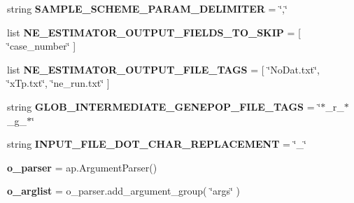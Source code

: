 \begin{DoxyCompactItemize}
\item 
string {\bfseries S\+A\+M\+P\+L\+E\+\_\+\+S\+C\+H\+E\+M\+E\+\_\+\+P\+A\+R\+A\+M\+\_\+\+D\+E\+L\+I\+M\+I\+T\+ER} = \char`\"{},\char`\"{}\hypertarget{namespacenegui_1_1pgdriveneestimator_a968165e72c6ac1b942ae21dc2ec18af2}{}\label{namespacenegui_1_1pgdriveneestimator_a968165e72c6ac1b942ae21dc2ec18af2}

\item 
list {\bfseries N\+E\+\_\+\+E\+S\+T\+I\+M\+A\+T\+O\+R\+\_\+\+O\+U\+T\+P\+U\+T\+\_\+\+F\+I\+E\+L\+D\+S\+\_\+\+T\+O\+\_\+\+S\+K\+IP} = \mbox{[} \char`\"{}case\+\_\+number\char`\"{} \mbox{]}\hypertarget{namespacenegui_1_1pgdriveneestimator_a77c91566694093f57286607ae144d35a}{}\label{namespacenegui_1_1pgdriveneestimator_a77c91566694093f57286607ae144d35a}

\item 
list {\bfseries N\+E\+\_\+\+E\+S\+T\+I\+M\+A\+T\+O\+R\+\_\+\+O\+U\+T\+P\+U\+T\+\_\+\+F\+I\+L\+E\+\_\+\+T\+A\+GS} = \mbox{[} \char`\"{}No\+Dat.\+txt\char`\"{}, \char`\"{}x\+Tp.\+txt\char`\"{}, \char`\"{}ne\+\_\+run.\+txt\char`\"{} \mbox{]}\hypertarget{namespacenegui_1_1pgdriveneestimator_a167fb016fbc3709c4c778c4a5157cd06}{}\label{namespacenegui_1_1pgdriveneestimator_a167fb016fbc3709c4c778c4a5157cd06}

\item 
string {\bfseries G\+L\+O\+B\+\_\+\+I\+N\+T\+E\+R\+M\+E\+D\+I\+A\+T\+E\+\_\+\+G\+E\+N\+E\+P\+O\+P\+\_\+\+F\+I\+L\+E\+\_\+\+T\+A\+GS} = \char`\"{}$\ast$\+\_\+r\+\_\+$\ast$\+\_\+g\+\_\+$\ast$\char`\"{}\hypertarget{namespacenegui_1_1pgdriveneestimator_a1bb977fffd730588ade2008f702d6110}{}\label{namespacenegui_1_1pgdriveneestimator_a1bb977fffd730588ade2008f702d6110}

\item 
string {\bfseries I\+N\+P\+U\+T\+\_\+\+F\+I\+L\+E\+\_\+\+D\+O\+T\+\_\+\+C\+H\+A\+R\+\_\+\+R\+E\+P\+L\+A\+C\+E\+M\+E\+NT} = \char`\"{}\+\_\+\char`\"{}\hypertarget{namespacenegui_1_1pgdriveneestimator_ae33783002cdab9bc1d96f7cfe99a0ec9}{}\label{namespacenegui_1_1pgdriveneestimator_ae33783002cdab9bc1d96f7cfe99a0ec9}

\item 
{\bfseries o\+\_\+parser} = ap.\+Argument\+Parser()\hypertarget{namespacenegui_1_1pgdriveneestimator_a5d6d3756a8ddff6ece719654fb970636}{}\label{namespacenegui_1_1pgdriveneestimator_a5d6d3756a8ddff6ece719654fb970636}

\item 
{\bfseries o\+\_\+arglist} = o\+\_\+parser.\+add\+\_\+argument\+\_\+group( \char`\"{}args\char`\"{} )\hypertarget{namespacenegui_1_1pgdriveneestimator_a22a84c6d9023007cf69fd2e3d62dcb86}{}\label{namespacenegui_1_1pgdriveneestimator_a22a84c6d9023007cf69fd2e3d62dcb86}


\end{DoxyCompactItemize}
